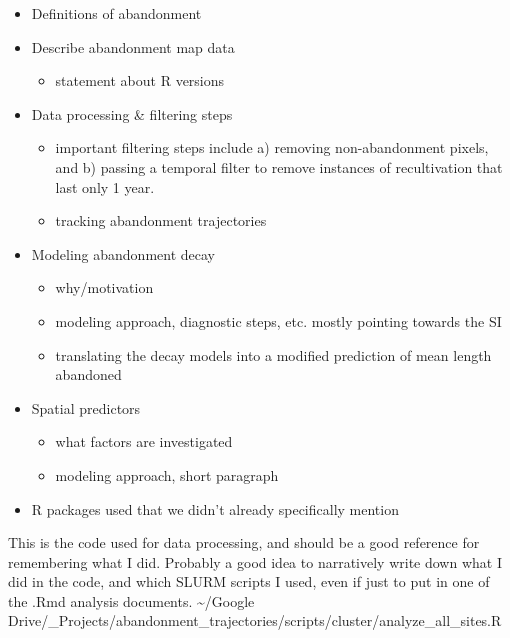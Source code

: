 \documentclass[
]{article}
\providecommand{\tightlist}{%
  \setlength{\itemsep}{0pt}\setlength{\parskip}{0pt}}
\begin{document}
\begin{itemize}
\tightlist
\item
  Definitions of abandonment
\item
  Describe abandonment map data

  \begin{itemize}
  \tightlist
  \item
    statement about R versions
  \end{itemize}
\item
  Data processing \& filtering steps

  \begin{itemize}
  \tightlist
  \item
    important filtering steps include a) removing non-abandonment pixels, and b) passing a temporal filter to remove instances of recultivation that last only 1 year.
  \item
    tracking abandonment trajectories
  \end{itemize}
\item
  Modeling abandonment decay

  \begin{itemize}
  \tightlist
  \item
    why/motivation
  \item
    modeling approach, diagnostic steps, etc. mostly pointing towards the SI
  \item
    translating the decay models into a modified prediction of mean length abandoned
  \end{itemize}
\item
  Spatial predictors

  \begin{itemize}
  \tightlist
  \item
    what factors are investigated
  \item
    modeling approach, short paragraph
  \end{itemize}
\item
  R packages used that we didn't already specifically mention
\end{itemize}

This is the code used for data processing, and should be a good reference for remembering what I did. Probably a good idea to narratively write down what I did in the code, and which SLURM scripts I used, even if just to put in one of the .Rmd analysis documents.
\textasciitilde/Google Drive/\_Projects/abandonment\_trajectories/scripts/cluster/analyze\_all\_sites.R
\end{document}
